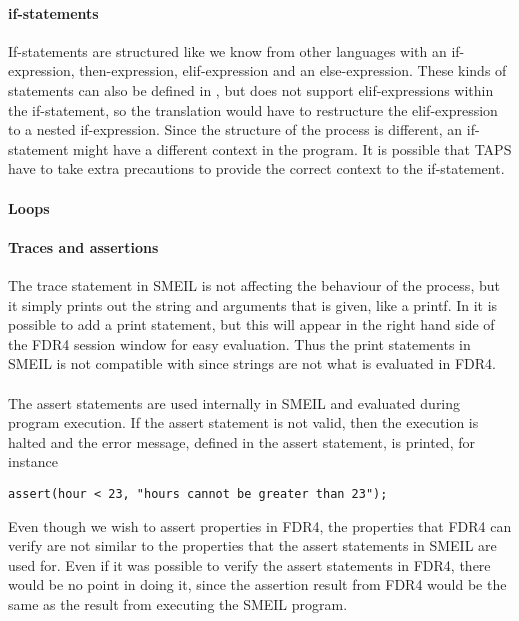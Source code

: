 \paragraph{if-statements}
If-statements are structured like we know from other languages with an if-expression, then-expression, elif-expression and an else-expression.
These kinds of statements can also be defined in \cspm, but \cspm does not support elif-expressions within the if-statement, so the translation would have to restructure the elif-expression to a nested if-expression.
Since the structure of the \cspm process is different, an if-statement might have a different context in the \cspm program. It is possible that TAPS have to take extra precautions to provide the correct context to the if-statement.
\paragraph{Loops}

\paragraph{Traces and assertions}
The trace statement in SMEIL is not affecting the behaviour of the process, but it simply prints out the string and arguments that is given, like a printf.
In \cspm it is possible to add a print statement, but this will appear in the right hand side of the FDR4 session window for easy evaluation. Thus the print statements in SMEIL is not compatible with \cspm since strings are not what is evaluated in FDR4.\\\\
The assert statements are used internally in SMEIL and evaluated during program execution. If the assert statement is not valid, then the execution is halted and the error message, defined in the assert statement, is printed, for instance
\begin{verbatim}
assert(hour < 23, "hours cannot be greater than 23");
\end{verbatim}
Even though we wish to assert properties in FDR4, the properties that FDR4 can verify are not similar to the properties that the assert statements in SMEIL are used for. Even if it was possible to verify the assert statements in FDR4, there would be no point in doing it, since the assertion result from FDR4 would be the same as the result from executing the SMEIL program.
